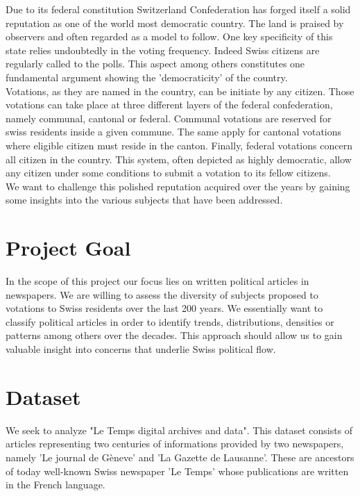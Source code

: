 \documentclass[11pt]{article}
\begin{document}
Due to its federal constitution Switzerland Confederation has forged itself
a solid reputation as one of the world most democratic country. The land is praised by observers and often
regarded as a model to follow. One key specificity of this state relies undoubtedly in the voting frequency.
Indeed Swiss citizens are regularly called to the polls. This aspect among others constitutes one fundamental
argument showing the 'democraticity' of the country.
\\
Votations, as they are named in the country, can be initiate by any citizen. Those votations can take place at
three different layers of the federal confederation, namely communal, cantonal or federal. Communal votations
are reserved for swiss residents inside a given commune. The same apply for cantonal votations where eligible citizen
must reside in the canton. Finally, federal votations concern all citizen in the country. This system, often
depicted as highly democratic, allow any citizen under some conditions to submit a votation to its fellow citizens.
\\
We want to challenge this polished reputation acquired over the years by gaining some insights into the various
subjects that have been addressed. 

\section{Project Goal}

In the scope of this project our focus lies on written political articles in newspapers. We are willing to assess 
the diversity of subjects proposed to votations to Swiss residents over the last 200 years. We essentially
want to classify political articles in order to identify trends, distributions, densities or patterns among 
others over the decades. This approach should allow us to gain valuable insight into concerns that underlie Swiss
political flow. 

\section{Dataset}

We seek to analyze "Le Temps digital archives and data". This dataset consists of articles representing two centuries of informations provided by two newspapers, namely 'Le journal de Gèneve' and 'La Gazette de Lausanne'. These are ancestors of today well-known Swiss newspaper 'Le Temps' whose publications are written in the French language.
\end{document}
